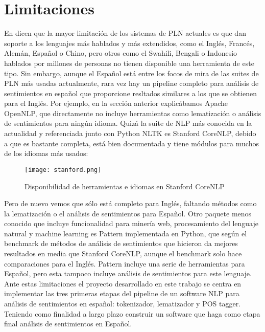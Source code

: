\section{Limitaciones}
En \citet{hirschberg2015advances} dicen que la mayor limitación de los sistemas de PLN actuales es que dan soporte a los lenguajes más hablados y más extendidos, como el Inglés, Francés, Alemán, Español o Chino, pero otros como el Swahili, Bengali o Indonesio hablados por millones de personas no tienen disponible una herramienta de este tipo. \newline
Sin embargo, aunque el Español está entre los focos de mira de las suites de PLN más usadas actualmente, rara vez hay un pipeline completo para análisis de sentimientos en español que proporcione resltados similares a los que se obtienen para el Inglés. Por ejemplo, en la sección anterior explicábamos \textcolor{SchoolColor}{Apache OpenNLP}, que directamente no incluye herramientas como lematización o análisis de sentimientos para ningún idioma.\newline
Quizá la suite de NLP más conocida en la actualidad y referenciada junto con \textcolor{SchoolColor}{Python NLTK} es \textcolor{SchoolColor}{Stanford CoreNLP}, debido a que es bastante completa, está bien documentada y tiene módulos para muchos de los idiomas más usados:
\begin{figure}[H]%
\centering
\texttt{[image: stanford.png]}  %
\label{}
\caption{Disponibilidad de herramientas e idiomas en Stanford CoreNLP}   
\end{figure}
Pero de nuevo vemos que sólo está completo para Inglés, faltando métodos como la lematización o el análisis de sentimientos para Español. Otro paquete menos conocido que incluye funcionalidad para minería web, procesamiento del lenguaje natural y machine learning es  \textcolor{SchoolColor}{Pattern} \citet{smedt2012pattern}  implementada en Python, que según el benchmark de métodos de análisis de sentimientos que hicieron \citet{ribeiro2016sentibench} da mejores resultados en media que Stanford CoreNLP, aunque el benchmark solo hace comparaciones para el Inglés. \newline
\textcolor{SchoolColor}{Pattern} incluye una serie de herramientas para Español, pero esta tampoco incluye análisis de sentimientos para este lenguaje. \newline
Ante estas limitaciones el proyecto desarrollado en este trabajo se centra en implementar las tres primeras etapas  del pipeline de un software NLP para análisis de sentimientos en español: tokenizador, lematizador y POS tagger.\newline
Teniendo como finalidad a largo plazo construir un software que haga como etapa final análisis de sentimientos en Español. 